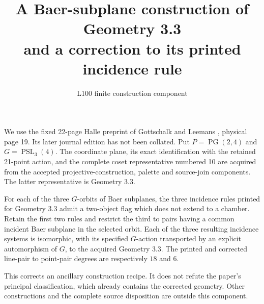\documentclass[11pt]{article}
\title{A Baer-subplane construction of Geometry 3.3\\and a correction to its printed incidence rule}
\author{L100 finite construction component}\date{}
\begin{document}
\maketitle
We use the fixed 22-page Halle preprint of Gottschalk and Leemans
\cite{GL}, physical page 19. Its later journal edition has not been
collated. Put $P=\operatorname{PG}(2,4)$ and $G=\operatorname{PSL}_3(4)$.
The coordinate plane, its exact identification with the retained
21-point action, and the complete coset representative numbered 10 are
acquired from the accepted projective-construction, palette and source-join
components. The latter representative is Geometry 3.3.

\begin{theorem}
For each of the three $G$-orbits of Baer subplanes, the three incidence
rules printed for Geometry 3.3 admit a two-object flag which does not
extend to a chamber. Retain the first two rules and restrict the third
to pairs having a common incident Baer subplane in the selected orbit.
Each of the three resulting incidence systems is isomorphic, with its
specified $G$-action transported by an explicit automorphism of $G$, to
the acquired Geometry 3.3. The printed and corrected line-pair to
point-pair degrees are respectively $18$ and $6$.
\end{theorem}
This corrects an ancillary construction recipe. It does not refute the
paper's principal classification, which already contains the corrected
geometry. Other constructions and the complete source disposition are
outside this component.
\end{document}
